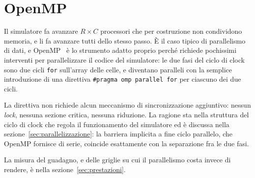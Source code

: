 \section{OpenMP}
\label{sec:openmp}

Il simulatore fa avanzare $R \times C$ processori che per costruzione non
condividono memoria, e li fa avanzare tutti dello stesso passo. È il caso
tipico di parallelismo di dati, e OpenMP~\cite{OpenMP} è lo strumento adatto proprio perché
richiede pochissimi interventi per parallelizzare il codice del simulatore: 
le due fasi del ciclo di clock sono due cicli \texttt{for} sull'array delle celle, 
e diventano paralleli con la semplice introduzione di una direttiva \texttt{\#pragma 
omp parallel for} per ciascuno dei due cicli.

La direttiva non richiede alcun meccanismo di sincronizzazione
aggiuntivo: nessun \emph{lock}, nessuna sezione critica, nessuna
riduzione. La ragione sta nella struttura del ciclo di clock che regola il funzionamento del simulatore ed è
discussa nella sezione~\ref{sec:parallelizzazione}: la barriera implicita
a fine ciclo parallelo, che OpenMP fornisce di serie, coincide
esattamente con la separazione fra le due fasi.

La misura del guadagno, e delle griglie su cui il parallelismo costa invece di
rendere, è nella sezione~\ref{sec:prestazioni}.